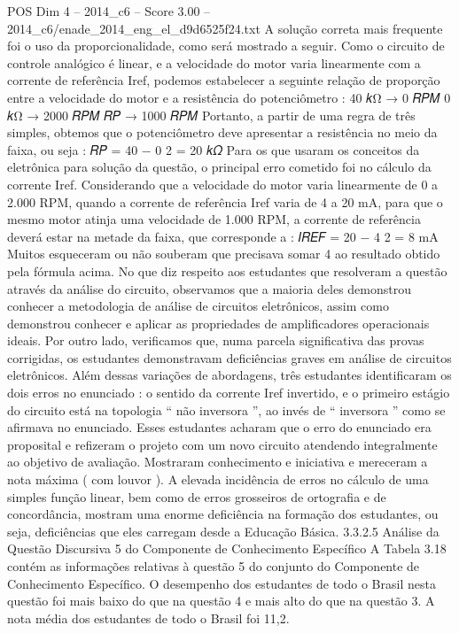 \begin{textsample}{POS Dim 4 – 2014\_c6 – Score 3.00 – 2014\_c6/enade\_2014\_eng\_el\_d9d6525f24.txt}
A solução correta mais frequente foi o uso da proporcionalidade, como será mostrado a seguir.
Como o circuito de controle analógico é linear, e a velocidade do motor varia linearmente com a corrente de referência Iref, podemos estabelecer a seguinte relação de proporção entre a velocidade do motor e a resistência do potenciômetro : 40 𝑘Ω → 0 𝑅𝑃𝑀 0 𝑘Ω → 2000 𝑅𝑃𝑀 𝑅𝑃 → 1000 𝑅𝑃𝑀 Portanto, a partir de uma regra de três simples, obtemos que o potenciômetro deve apresentar a resistência no meio da faixa, ou seja : 𝑅𝑃 = 40 − 0 2 = 20 𝑘𝛺 Para os que usaram os conceitos da eletrônica para solução da questão, o principal erro cometido foi no cálculo da corrente Iref.
Considerando que a velocidade do motor varia linearmente de 0 a 2.000 RPM, quando a corrente de referência Iref varia de 4 a 20 mA, para que o mesmo motor atinja uma velocidade de 1.000 RPM, a corrente de referência deverá estar na metade da faixa, que corresponde a : 𝐼𝑅𝐸𝐹 = 20 − 4 2 = 8 mA Muitos esqueceram ou não souberam que precisava somar 4 ao resultado obtido pela fórmula acima.
No que diz respeito aos estudantes que resolveram a questão através da análise do circuito, observamos que a maioria deles demonstrou conhecer a metodologia de análise de circuitos eletrônicos, assim como demonstrou conhecer e aplicar as propriedades de amplificadores operacionais ideais.
Por outro lado, verificamos que, numa parcela significativa das provas corrigidas, os estudantes demonstravam deficiências graves em análise de circuitos eletrônicos.
Além dessas variações de abordagens, três estudantes identificaram os dois erros no enunciado : o sentido da corrente Iref invertido, e o primeiro estágio do circuito está na topologia “ não inversora ”, ao invés de “ inversora ” como se afirmava no enunciado.
Esses estudantes acharam que o erro do enunciado era proposital e refizeram o projeto com um novo circuito atendendo integralmente ao objetivo de avaliação.
Mostraram conhecimento e iniciativa e mereceram a nota máxima ( com louvor ).
A elevada incidência de erros no cálculo de uma simples função linear, bem como de erros grosseiros de ortografia e de concordância, mostram uma enorme deficiência na formação dos estudantes, ou seja, deficiências que eles carregam desde a Educação Básica. 3.3.2.5 Análise da Questão Discursiva 5 do Componente de Conhecimento Específico A Tabela 3.18 contém as informações relativas à questão 5 do conjunto do Componente de Conhecimento Específico.
O desempenho dos estudantes de todo o Brasil nesta questão foi mais baixo do que na questão 4 e mais alto do que na questão 3.
A nota média dos estudantes de todo o Brasil foi 11,2.

\end{textsample}
